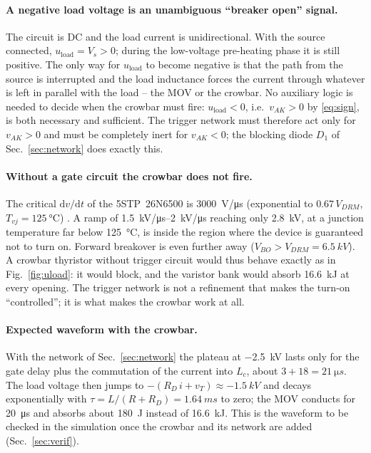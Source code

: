 \documentclass[11pt,a4paper]{article}
\begin{document}
\paragraph{A negative load voltage is an unambiguous ``breaker open'' signal.}
The circuit is DC and the load current is unidirectional. With the source connected,
$u_{\mathrm{load}} = V_s > 0$; during the low-voltage pre-heating phase it is still positive.
The only way for $u_{\mathrm{load}}$ to become negative is that the path from the source is
interrupted and the load inductance forces the current through whatever is left in parallel with
the load -- the MOV or the crowbar. No auxiliary logic is needed to decide when the crowbar must
fire: $u_{\mathrm{load}} < 0$, i.e.\ $v_{AK} > 0$ by \eqref{eq:sign}, is both necessary and
sufficient. The trigger network must therefore act only for $v_{AK} > 0$ and must be
completely inert for $v_{AK} < 0$; the blocking diode $D_1$ of Sec.~\ref{sec:network} does
exactly this.

\paragraph{Without a gate circuit the crowbar does not fire.}
The critical $\mathrm{d}v/\mathrm{d}t$ of the 5STP~26N6500 is \SI{3000}{V/\micro s}
(exponential to $0.67\,V_{DRM}$, $T_{vj} = \SI{125}{\celsius}$) \cite{ds26n6500}. A ramp of
\SIrange{1.5}{2}{kV/\micro s} reaching only \SI{2.8}{kV}, at a junction temperature far below
\SI{125}{\celsius}, is inside the region where the device is guaranteed not to turn on.
Forward breakover is even further away ($V_{BO} > V_{DRM} = \SI{6.5}{kV}$). A crowbar thyristor
without trigger circuit would thus behave exactly as in Fig.~\ref{fig:uload}: it would block,
and the varistor bank would absorb \SI{16.6}{kJ} at every opening. The trigger network is not a
refinement that makes the turn-on ``controlled''; it is what makes the crowbar work at all.

\paragraph{Expected waveform with the crowbar.}
With the network of Sec.~\ref{sec:network} the plateau at \SI{-2.5}{kV} lasts only for the
gate delay plus the commutation of the current into $L_c$, about $3 + 18 = \SI{21}{\micro s}$.
The load voltage then jumps to $-(R_D\,i + v_T) \approx \SI{-1.5}{kV}$ and decays exponentially
with $\tau = L/(R + R_D) = \SI{1.64}{ms}$ to zero; the MOV conducts for
\SI{20}{\micro s} and absorbs about \SI{180}{J} instead of \SI{16.6}{kJ}. This is the waveform
to be checked in the simulation once the crowbar and its network are added
(Sec.~\ref{sec:verif}).
\end{document}
